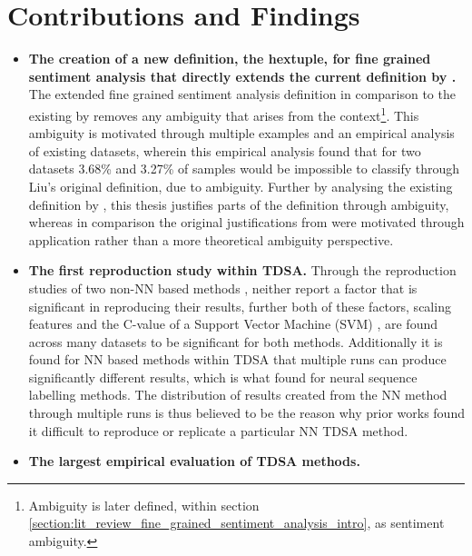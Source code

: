 \section{Contributions and Findings}
\begin{itemize}
    \item \textbf{The creation of a new definition, the hextuple, for fine grained sentiment analysis that directly extends the current definition by \citet{liu2015sentiment}.}\newline
    The extended fine grained sentiment analysis definition in comparison to the existing by \citet{liu2015sentiment} removes any ambiguity that arises from the context\footnote{Ambiguity is later defined, within section \ref{section:lit_review_fine_grained_sentiment_analysis_intro}, as sentiment ambiguity.}. This ambiguity is motivated through multiple examples and an empirical analysis of existing datasets, wherein this empirical analysis found that for two datasets 3.68\% and 3.27\% of samples would be impossible to classify through Liu's \citep{liu2015sentiment} original definition, due to ambiguity. Further by analysing the existing definition by \citet{liu2015sentiment}, this thesis justifies parts of the definition through ambiguity, whereas in comparison the original justifications from \citet{liu2015sentiment} were motivated through application rather than a more theoretical ambiguity perspective.  
    \item \textbf{The first reproduction study within TDSA.}\newline
    Through the reproduction studies of two non-NN based methods \citep{vo2015target, wang-etal-2017-tdparse}, neither report a factor that is significant in reproducing their results, further both of these factors, scaling features and the C-value of a Support Vector Machine (SVM) \citep{chang2011libsvm}, are found across many datasets to be significant for both methods. Additionally it is found for NN based methods within TDSA that multiple runs can produce significantly different results, which is what \citet{reimers-gurevych-2017-reporting} found for neural sequence labelling methods. The distribution of results created from the NN method through multiple runs is thus believed to be the reason why prior works found it difficult to reproduce or replicate a particular NN TDSA method.
    \item \textbf{The largest empirical evaluation of TDSA methods.}\newline

\end{itemize}
